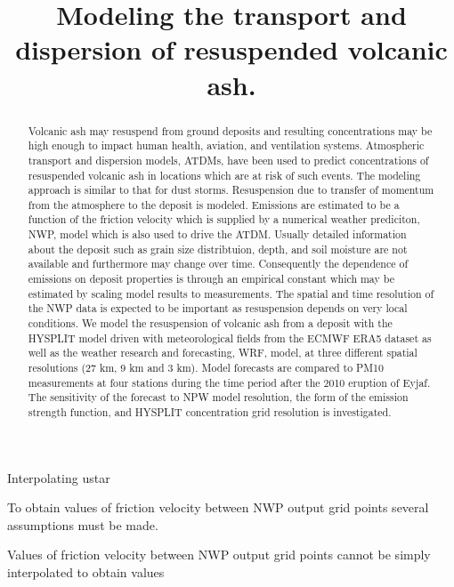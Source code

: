 \documentclass[acp, manuscript]{copernicus}
\begin{document}
\title{Modeling the transport and dispersion of resuspended volcanic ash. }









\received{}
\pubdiscuss{} %
\revised{}
\accepted{}
\published{}


\maketitle

\begin{abstract}

Volcanic ash may resuspend from ground deposits and resulting concentrations may be high enough to impact human health, aviation, and ventilation systems.
Atmospheric transport and dispersion models, ATDMs, have been used to predict concentrations of resuspended volcanic ash in locations which are at risk of such events.
The modeling approach is similar to that for dust storms. Resuspension due to transfer of momentum from the atmosphere to the deposit is modeled. 
Emissions are estimated to be a function of the friction velocity which is supplied by a numerical weather prediciton, NWP, model which is also used
to drive the ATDM. 
Usually detailed information about the deposit such as
grain size distribtuion, depth, and soil moisture are not available and furthermore may change over time.
Consequently the dependence of emissions on deposit properties is through an empirical constant which may be estimated by scaling model results to measurements.
The spatial and time resolution of the NWP data is expected to be important as resuspension depends on very local conditions. 
We model the resuspension of volcanic ash from a deposit with the HYSPLIT model driven with meteorological fields from the ECMWF ERA5 dataset as well as the weather research and forecasting, WRF, model, at three different spatial resolutions (27 km, 9 km and 3 km). 
Model forecasts are compared to PM10 measurements at four stations during the time period after the 2010 eruption of Eyjaf. 
The sensitivity of the forecast to NPW model resolution, the form of the emission strength function,
and HYSPLIT concentration grid resolution is investigated. 



\end{abstract}

Interpolating ustar

To obtain values of friction velocity between NWP output grid points several assumptions must be made.

Values of friction velocity between NWP output grid points cannot be simply interpolated to obtain values 
\end{document}
